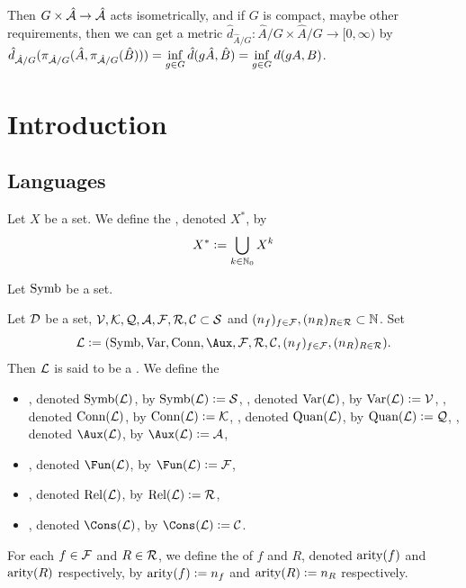 \documentclass{book}
\begin{document}
\begin{itemize}
		Then $G \times \hat{\mathcal{A}} \rightarrow \hat{\mathcal{A}}$ acts isometrically, and if $G$ is compact, maybe other requirements, then we can get a metric $\hat{d}_{\hat{A}/G} : \hat{A}/G \times \hat{A}/G \rightarrow [0, \infty)$ by $\hat{d}_{\hat{\mathcal{A}}/G}(\pi_{\hat{\mathcal{A}}/G}(\hat{A}, \pi_{\hat{\mathcal{A}}/G}(\hat{B}))) = \inf\limits_{g \in G} \hat{d}(g \hat{A}, \hat{B}) = \inf\limits_{g \in G} d(gA, B)$.
		
		
	\end{itemize}
	
	
	
	\chapter{Introduction}
	
	\section{Languages}
	
	\begin{defn}
		Let $X$ be a set. We define the , denoted $X^*$, by 
		$$X^* \vcentcolon= \bigcup_{k \in \mathbb{N}_0} X^k$$
	\end{defn}
	
	\begin{defn}
		Let $\operatorname{\text{Symb}}$ be a set.  
	\end{defn}
	
	\begin{defn}
		Let $\mathcal{D}$ be a set, $\mathcal{V}, \mathcal{K}, \mathcal{Q}, \mathcal{A}, \mathcal{F}, \mathcal{R}, \mathcal{C} \subset \mathcal{S}$ and $(n_f)_{f \in \mathcal{F}}, (n_R)_{R \in \mathcal{R}} \subset \mathbb{N}$. Set 
		$$\ML \defeq (\Symb, \Var, \Conn, \Aux, \MF, \MR, \MC, (n_f)_{f \in \MF}, (n_R)_{R \in \MR}).$$ 
		Then $\mathcal{L}$ is said to be a \tbf{formal language}. 
		We define the 
		\begin{itemize}
			\item {}, denoted $\operatorname{\text{Symb}}(\mathcal{L})$, by $\operatorname{\text{Symb}}(\mathcal{L}) \vcentcolon= \mathcal{S}$,
			, denoted $\operatorname{\text{Var}}(\mathcal{L})$, by $\operatorname{\text{Var}}(\mathcal{L}) \vcentcolon= \mathcal{V}$,
			, denoted $\operatorname{\text{Conn}}(\mathcal{L})$, by $\operatorname{\text{Conn}}(\mathcal{L}) \vcentcolon= \mathcal{K}$,
			, denoted $\operatorname{\text{Quan}}(\mathcal{L})$, by $\operatorname{\text{Quan}}(\mathcal{L}) \vcentcolon= \mathcal{Q}$,
			, denoted $\Aux(\ML)$, by $\Aux(\ML) \defeq \MA$,
			\item {}, denoted $\Fun(\ML)$, by $\Fun(\ML) \defeq \MF$,
			\item {}, denoted $\text{Rel}(\mathcal{L})$, by $\text{Rel}(\mathcal{L}) \vcentcolon= \mathcal{R}$,
			\item {}, denoted $\Cons(\ML)$, by $\Cons(\ML) \defeq \MC$.
		\end{itemize}
		For each $f \in \mathcal{F}$ and $R \in \mathcal{R}$, we define the  of $f$ and $R$, denoted $\operatorname*{\text{arity}}(f)$ and $\operatorname*{\text{arity}}(R)$ respectively, by $\operatorname*{\text{arity}}(f) \vcentcolon= n_f$ and $\operatorname*{\text{arity}}(R) \vcentcolon= n_R$ respectively.
	\end{defn}
	
\end{document}
